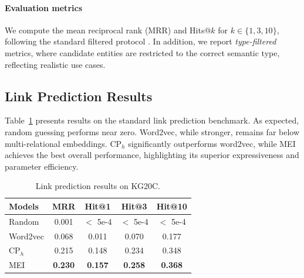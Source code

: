 \documentclass[conference]{IEEEtran}
\begin{document}
\paragraph*{Evaluation metrics}
We compute the mean reciprocal rank (MRR) and Hits@$k$ for $k \in \{1, 3, 10\}$, following the standard filtered protocol \cite{bordes_translatingembeddingsmodeling_2013}. In addition, we report \textit{type-filtered} metrics, where candidate entities are restricted to the correct semantic type, reflecting realistic use cases.

\subsection{Link Prediction Results}

Table~\ref{tab:result_kg20c} presents results on the standard link prediction benchmark. As expected, random guessing performs near zero. Word2vec, while stronger, remains far below multi-relational embeddings. CP$_h$ significantly outperforms word2vec, while MEI achieves the best overall performance, highlighting its superior expressiveness and parameter efficiency.

\begin{table}[htb]
	\small
	\centering
	\caption{Link prediction results on KG20C.}
	\label{tab:result_kg20c}
	\begin{tabular}{lcccc}
		\toprule
		\textbf{Models} & \textbf{MRR} & \textbf{Hit@1} & \textbf{Hit@3} & \textbf{Hit@10}\\ 
		\hline
		Random & 0.001 & $ < $ 5e-4 & $ < $ 5e-4 & $ < $ 5e-4\\
		Word2vec & 0.068 & 0.011 & 0.070 & 0.177\\
		CP$_h$ & 0.215 & 0.148 & 0.234 & 0.348\\
		MEI & \textbf{0.230} & \textbf{0.157} & \textbf{0.258} & \textbf{0.368}\\
		\bottomrule
	\end{tabular}
\end{table}
\end{document}
